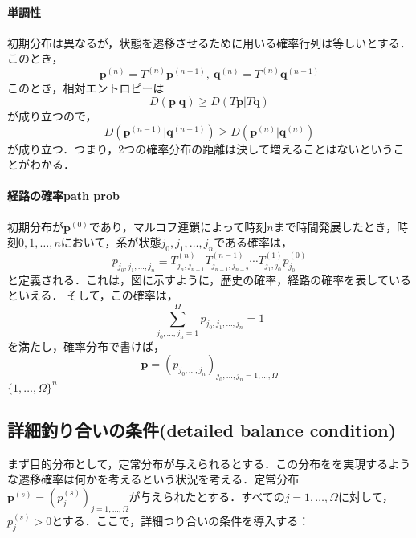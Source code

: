 \paragraph{単調性}
初期分布は異なるが，状態を遷移させるために用いる確率行列は等しいとする．このとき，
\begin{equation}
    \bm{p}^{(n)}=T^{(n)}\bm{p}^{(n-1)},\ \bm{q}^{(n)}=T^{(n)}\bm{q}^{(n-1)}
\end{equation}
このとき，相対エントロピーは
\begin{equation}
    D(\bm{p}|\bm{q})\geq D(T\bm{p}|T\bm{q})
\end{equation}
が成り立つので，
\begin{equation}
    D(\bm{p}^{(n-1)}|\bm{q}^{(n-1)})\geq D(\bm{p}^{(n)}|\bm{q}^{(n)})
\end{equation}
が成り立つ．つまり，2つの確率分布の距離は決して増えることはないということがわかる．

\paragraph{経路の確率path prob}
初期分布が$\bm{p}^{(0)}$であり，マルコフ連鎖によって時刻$n$まで時間発展したとき，時刻$0,1,\ldots,n$において，系が状態$j_0,j_1,\ldots,j_n$である確率は，
\begin{equation}
    p_{j_0,j_1,\ldots,j_n}\equiv
    T_{j_n,j_{n-1}}^{(n)}T_{j_{n-1},j_{n-2}}^{(n-1)}\cdots T_{j_1,j_0}^{(1)}p_{j_0}^{(0)}
\end{equation}
と定義される．これは，図に示すように，歴史の確率，経路の確率を表しているといえる．
そして，この確率は，
\begin{equation}
    \sum_{j_0,\ldots,j_n=1}^{\Omega}p_{j_0,j_1,\ldots,j_n}=1
\end{equation}
を満たし，確率分布で書けば，
\begin{equation}
    \bm{p}=(p_{j_0,\ldots,j_n})_{j_0,\ldots,j_n=1,\ldots,\Omega}
\end{equation}
$\{1,\ldots,\Omega\}^n$






\subsection{詳細釣り合いの条件(detailed balance condition)}
まず目的分布として，定常分布が与えられるとする．この分布をを実現するような遷移確率は何かを考えるという状況を考える．定常分布$\bm{p}^{(s)}=(p_j^{(s)})_{j=1,\ldots,\Omega}$が与えられたとする．すべての$j=1,\ldots,\Omega$に対して，$p^{(s)}_j>0$とする．ここで，詳細つり合いの条件を導入する：

